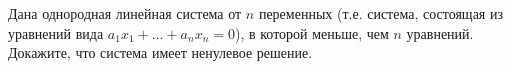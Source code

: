 Дана однородная линейная система от $n$ переменных (т.е. система, состоящая из уравнений вида $a_1 x_1 + \dots + a_n x_n =
0$), в которой меньше, чем $n$ уравнений. Докажите, что система имеет ненулевое решение.

